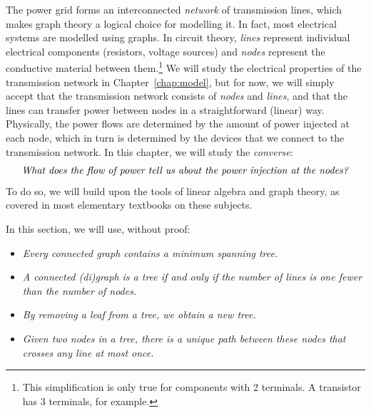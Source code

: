 \documentclass[main.tex]{subfiles}
\begin{document}

The power grid forms an interconnected \emph{network} of transmission lines, which makes graph theory a logical choice for modelling it.
In fact, most electrical systems are modelled using graphs. In circuit theory, \emph{lines} represent individual electrical components (resistors, voltage sources) and \emph{nodes} represent the conductive material between them.\footnote{This simplification is only true for components with 2 terminals. A transistor has 3 terminals, for example.}
We will study the electrical properties of the transmission network in Chapter~\ref{chap:model}, but for now, we will simply accept that the transmission network consists of \emph{nodes} and \emph{lines}, and that the lines can transfer power between nodes in a straightforward (linear) way. Physically, the power flows are determined by the amount of power injected at each node, which in turn is determined by the devices that we connect to the transmission network. In this chapter, we will study the \emph{converse}:
\[
\text{\textit{What does the flow of power tell us about the power injection at the nodes?}}
\]
To do so, we will build upon the tools of linear algebra and graph theory, as covered in most elementary textbooks on these subjects.

In this section, we will use, without proof:
\begin{itemize}
\item \emph{Every connected graph contains a minimum spanning tree.}
\item \emph{A connected (di)graph is a \emph{tree} if and only if the number of lines is one fewer than the number of nodes.}
\item \emph{By removing a leaf from a tree, we obtain a new tree.}
\item \emph{Given two nodes in a tree, there is a unique path between these nodes that crosses any line at most once.}
\end{itemize}
\end{document}

